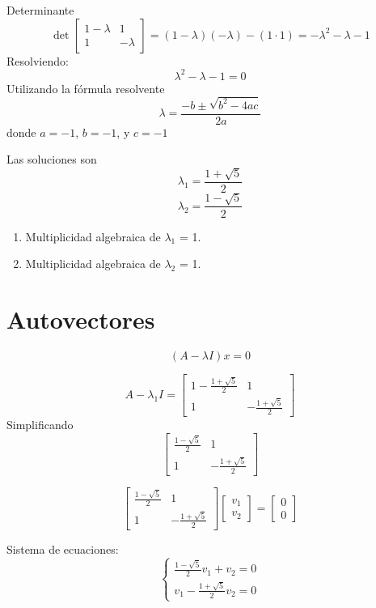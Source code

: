 \documentclass{article}
\begin{document}
Determinante
\[
\det \begin{bmatrix}
1 - \lambda & 1 \\
1 & -\lambda
\end{bmatrix} = (1 - \lambda)(-\lambda) - (1 \cdot 1) = -\lambda^2 - \lambda - 1 
\]
Resolviendo:
\[
\lambda^2 - \lambda - 1 = 0
\]
Utilizando la fórmula resolvente
\[
\lambda = \frac{-b \pm \sqrt{b^2 - 4ac}}{2a}
\]
donde \( a = -1 \), \( b = -1 \), y \( c = -1 \)

Las soluciones son
\[
\lambda_1 = \frac{1 + \sqrt{5}}{2}
\]
\[
\lambda_2 = \frac{1 - \sqrt{5}}{2}
\]

\begin{enumerate}
    \item Multiplicidad algebraica de \( \lambda_1 \) = 1.
    \item Multiplicidad algebraica de \( \lambda_2 \) = 1.
\end{enumerate}

\section*{Autovectores}

\[
(A - \lambda I)x = 0
\]

\[
A - \lambda_1 I = \begin{bmatrix}
1 - \frac{1 + \sqrt{5}}{2} & 1 \\
1 & -\frac{1 + \sqrt{5}}{2}
\end{bmatrix}
\]
Simplificando
\[
\begin{bmatrix}
\frac{1 - \sqrt{5}}{2} & 1 \\
1 & -\frac{1 + \sqrt{5}}{2}
\end{bmatrix}
\]

\[
\begin{bmatrix}
\frac{1 - \sqrt{5}}{2} & 1 \\
1 & -\frac{1 + \sqrt{5}}{2}
\end{bmatrix}
\begin{bmatrix}
v_1 \\
v_2
\end{bmatrix}
=
\begin{bmatrix}
0 \\
0
\end{bmatrix}
\]

Sistema de ecuaciones:
\[
\left\{
\begin{array}{l}
\frac{1 - \sqrt{5}}{2} v_1 + v_2 = 0 \\
v_1 - \frac{1 + \sqrt{5}}{2} v_2 = 0
\end{array}
\right.
\]
\end{document}
